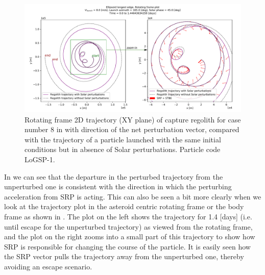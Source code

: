 \begin{figure}[htb]
\centering
\captionsetup{justification=centering}
\includegraphics[angle=90, width=\textwidth, height=\textheight, keepaspectratio=true]{longest_edge_perturbations/3.2Density_1cmSize/8ms_165Azimuth_45SolarPhase/comparative_analysis_allPerturbations_rotatingFrame_edited.pdf}
\caption{Rotating frame 2D trajectory (XY plane) of capture regolith for case number 8 in  with direction of the net perturbation vector, compared with the trajectory of a particle launched with the same initial conditions but in absence of Solar perturbations. Particle code LoGSP-1.}
\label{fig:LoGSP_1_capture_case_8_2d_trajectory_comparative_bodyFrame}
\end{figure}
\FloatBarrier
In  we can see that the departure in the perturbed trajectory from the unperturbed one is consistent with the direction in which the perturbing acceleration from \gls{SRP} is acting. This can also be seen a bit more clearly when we look at the trajectory plot in the asteroid centric rotating frame or the body frame as shown in . The plot on the left shows the trajectory for 1.4 [days] (i.e. until escape for the unperturbed trajectory) as viewed from the rotating frame, and the plot on the right zooms into a small part of this trajectory to show how \gls{SRP} is responsible for changing the course of the particle. It is easily seen how the \gls{SRP} vector pulls the trajectory away from the unperturbed one, thereby avoiding an escape scenario.

